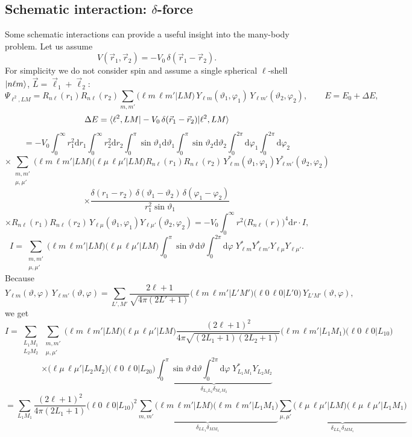 \documentclass[11pt,a4paper]{article}
\newcommand{\ud}{\mathrm{d}}
\begin{document}
\subsection{Schematic interaction: \texorpdfstring{$\delta$}{delta}-force}
Some schematic interactions can provide a useful insight into the many-body problem. Let us assume
\[
V(\vec r_1,\vec r_2)=-V_0\,\delta(\vec r_1-\vec r_2).
\]
For simplicity we do not consider spin and assume a single spherical $\ell$-shell $\ket{n\ell m}$, $\vec L=\vec\ell_1+\vec\ell_2$:
\[
\Psi_{\ell^2,LM}=R_{n\ell}(r_1)R_{n\ell}(r_2)\sum_{m,m'}\big(\ell m\,\ell m'\big|LM\big)\,Y_{\ell m}(\vartheta_1,\varphi_1)\,Y_{\ell m'}(\vartheta_2,\varphi_2),
\qquad E=E_0+\Delta E,
\]
\[
\Delta E=\braket{\ell^2,LM|-V_0\,\delta(\vec r_1-\vec r_2)|\ell^2,LM}
\]
\[
=-V_0\int_0^\infty r_1^2\ud r_1\int_0^\infty r_2^2\ud r_2\int_0^\pi\sin\vartheta_1\ud\vartheta_1\int_0^\pi\sin\vartheta_2\ud\vartheta_2\int_0^{2\pi}\ud\varphi_1\int_0^{2\pi}\ud\varphi_2
\]
\[
\times\sum_{\substack{m,m'\\ \mu,\mu'}}\big(\ell m\,\ell m'\big|LM\big)\big(\ell\mu\,\ell\mu'\big|LM\big)
R_{n\ell}(r_1)R_{n\ell}(r_2)\,Y^*_{\ell m}(\vartheta_1,\varphi_1)Y^*_{\ell m'}(\vartheta_2,\varphi_2)
\]
\[
\times\frac{\delta(r_1-r_2)\,\delta(\vartheta_1-\vartheta_2)\,\delta(\varphi_1-\varphi_2)}{r_1^2\sin\vartheta_1}
\]
\[
\times R_{n\ell}(r_1)R_{n\ell}(r_2)\,Y_{\ell\mu}(\vartheta_1,\varphi_1)Y_{\ell\mu'}(\vartheta_2,\varphi_2)
=-V_0\int_0^\infty r^2\big(R_{n\ell}(r)\big)^4\ud r\cdot I,
\]
\[
I=\sum_{\substack{m,m'\\ \mu,\mu'}}\big(\ell m\,\ell m'\big|LM\big)\big(\ell\mu\,\ell\mu'\big|LM\big)\int_0^\pi\sin\vartheta\,\ud\vartheta\int_0^{2\pi}\ud\varphi\;Y^*_{\ell m}Y^*_{\ell m'}Y_{\ell\mu}Y_{\ell\mu'} .
\]
Because
\[
Y_{\ell m}(\vartheta,\varphi)\,Y_{\ell m'}(\vartheta,\varphi)=\sum_{L',M'}\frac{2\ell+1}{\sqrt{4\pi(2L'+1)}}\big(\ell m\,\ell m'\big|L'M'\big)\big(\ell0\,\ell0\big|L'0\big)\,Y_{L'M'}(\vartheta,\varphi),
\]
we get
\[
I=\sum_{\substack{L_1M_1\\L_2M_2}}\sum_{\substack{m,m'\\ \mu,\mu'}}\big(\ell m\,\ell m'\big|LM\big)\big(\ell\mu\,\ell\mu'\big|LM\big)\frac{(2\ell+1)^2}{4\pi\sqrt{(2L_1+1)(2L_2+1)}}\big(\ell m\,\ell m'\big|L_1M_1\big)\big(\ell0\,\ell0\big|L_10\big)
\]
\[
\times\big(\ell\mu\,\ell\mu'\big|L_2M_2\big)\big(\ell0\,\ell0\big|L_20\big)
\underbrace{\int_0^\pi\sin\vartheta\,\ud\vartheta\int_0^{2\pi}\ud\varphi\;Y^*_{L_1M_1}Y_{L_2M_2}}_{\delta_{L_1L_2}\delta_{M_1M_2}}
\]
\[
=\sum_{L_1M_1}\frac{(2\ell+1)^2}{4\pi(2L_1+1)}\big(\ell0\,\ell0\big|L_10\big)^2
\underbrace{\sum_{m,m'}\big(\ell m\,\ell m'\big|LM\big)\big(\ell m\,\ell m'\big|L_1M_1\big)}_{\delta_{LL_1}\delta_{MM_1}}
\underbrace{\sum_{\mu,\mu'}\big(\ell\mu\,\ell\mu'\big|LM\big)\big(\ell\mu\,\ell\mu'\big|L_1M_1\big)}_{\delta_{LL_1}\delta_{MM_1}}
\]
\end{document}
